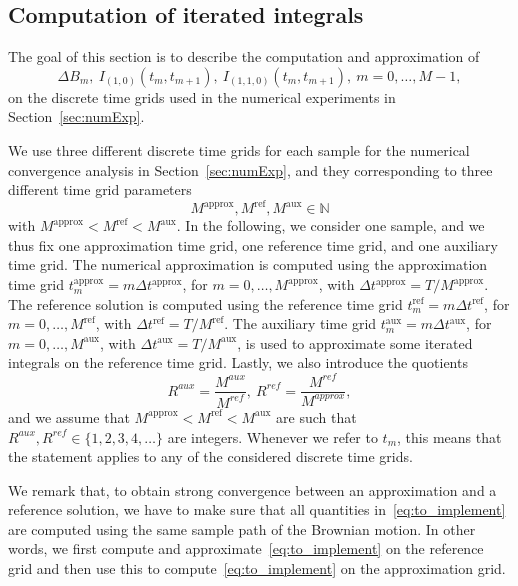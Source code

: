 \documentclass[11pt]{amsart}
\newcommand{\app}{\operatorname{approx}}
\newcommand{\refe}{\operatorname{ref}}
\newcommand{\aux}{\operatorname{aux}}
\begin{document}
{\subsection{Computation of iterated integrals}\label{sec:comp_iter_ints}
The goal of this section is to describe the computation and approximation of
\begin{equation}\label{eq:to_implement}
\Delta B_{m},\ I_{(1,0)}(t_{m},t_{m+1}),\ I_{(1,1,0)}(t_{m},t_{m+1}),\ m=0,\ldots,M-1,
\end{equation}
on the discrete time grids used in the numerical experiments in Section~\ref{sec:numExp}.

We use three different discrete time grids for each sample for the numerical convergence analysis in Section~\ref{sec:numExp}, and they corresponding to three different time grid parameters
\begin{equation*}
M^{\app}, M^{\refe}, M^{\aux} \in \mathbb{N}
\end{equation*}  
with $M^{\app} < M^{\refe} < M^{\aux}$. In the following, we consider one sample, and we thus fix one approximation time grid, one reference time grid, and one auxiliary time grid. The numerical approximation is computed using the approximation time grid $t^{\app}_{m} = m \Delta t^{\app}$, for $m=0,\ldots,M^{\app}$, with $\Delta t^{\app} = T/M^{\app}$. The reference solution is computed using the reference time grid $t^{\refe}_{m} = m \Delta t^{\refe}$, for $m=0,\ldots,M^{\refe}$, with $\Delta t^{\refe} = T/M^{\refe}$. The auxiliary time grid $t^{\aux}_{m} = m \Delta t^{\aux}$, for $m=0,\ldots,M^{\aux}$, with $\Delta t^{\aux} = T/M^{\aux}$, is used to approximate some iterated integrals on the reference time grid. Lastly, we also introduce the quotients
\begin{equation*}
R^{aux} = \frac{M^{aux}}{M^{ref}},\ R^{ref} = \frac{M^{ref}}{M^{approx}},
\end{equation*}
and we assume that $M^{\app} < M^{\refe} < M^{\aux}$ are such that $R^{aux}, R^{ref} \in \{1,2,3,4,\ldots \}$ are integers. Whenever we refer to $t_{m}$, this means that the statement applies to any of the considered discrete time grids.

We remark that, to obtain strong convergence between an approximation and a reference solution, we have to make sure that all quantities in~\eqref{eq:to_implement} are computed using the same sample path of the Brownian motion. In other words, we first compute and approximate~\eqref{eq:to_implement} on the reference grid and then use this to compute~\eqref{eq:to_implement} on the approximation grid.

}
\end{document}
